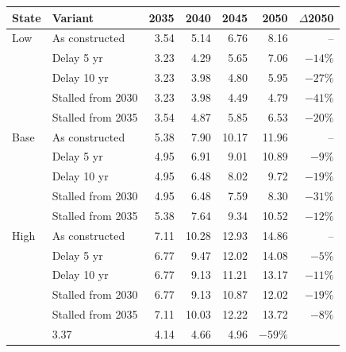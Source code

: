 \begin{tabular}{@{}llrrrrr@{}}
\toprule
State & Variant & 2035 & 2040 & 2045 & 2050 & $\Delta$2050 \\
\midrule
Low & As constructed & 3.54 & 5.14 & 6.76 & 8.16 & -- \\
 & Delay 5 yr & 3.23 & 4.29 & 5.65 & 7.06 & $-14\%$ \\
 & Delay 10 yr & 3.23 & 3.98 & 4.80 & 5.95 & $-27\%$ \\
 & Stalled from 2030 & 3.23 & 3.98 & 4.49 & 4.79 & $-41\%$ \\
 & Stalled from 2035 & 3.54 & 4.87 & 5.85 & 6.53 & $-20\%$ \\
\addlinespace
Base & As constructed & 5.38 & 7.90 & 10.17 & 11.96 & -- \\
 & Delay 5 yr & 4.95 & 6.91 & 9.01 & 10.89 & $-9\%$ \\
 & Delay 10 yr & 4.95 & 6.48 & 8.02 & 9.72 & $-19\%$ \\
 & Stalled from 2030 & 4.95 & 6.48 & 7.59 & 8.30 & $-31\%$ \\
 & Stalled from 2035 & 5.38 & 7.64 & 9.34 & 10.52 & $-12\%$ \\
\addlinespace
High & As constructed & 7.11 & 10.28 & 12.93 & 14.86 & -- \\
 & Delay 5 yr & 6.77 & 9.47 & 12.02 & 14.08 & $-5\%$ \\
 & Delay 10 yr & 6.77 & 9.13 & 11.21 & 13.17 & $-11\%$ \\
 & Stalled from 2030 & 6.77 & 9.13 & 10.87 & 12.02 & $-19\%$ \\
 & Stalled from 2035 & 7.11 & 10.03 & 12.22 & 13.72 & $-8\%$ \\
\addlinespace
\multicolumn{2}{@{}l}{2025 entry shares frozen (2030: 2.35 TWh)} & 3.37 & 4.14 & 4.66 & 4.96 & $-59\%$ \\
\bottomrule
\end{tabular}
